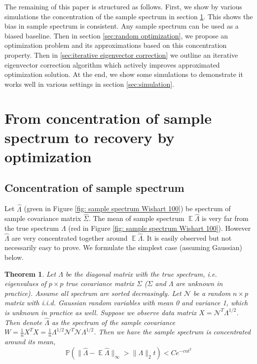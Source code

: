 \documentclass[12pt]{extarticle}
\newtheorem{theorem}{Theorem}
\newcommand{\cN}{{\mathcal{N}}}
\newcommand{\field}[1]{\mathbb{#1}}
\newcommand{\1}{\field{1}}
\newcommand{\p}{\field{P}}
\DeclareMathOperator{\E}{\mathbb{E}}
\numberwithin{equation}{section}
\begin{document}
The remaining of this paper is structured as follows. First, we show by various simulations the concentration of the sample spectrum in section \ref{sec:concentration}. This shows the bias in sample spectrum is consistent. Any sample spectrum can be used as a biased baseline. Then in section \ref{sec:random optimization}, we propose an optimization problem and its approximations based on this concentration property. Then in \ref{sec:iterative eigenvector correction} we outline an iterative eigenvector correction algorithm which actively improves approximated optimization solution. At the end, we show some simulations to demonstrate it works well in various settings in section \ref{sec:simulation}. 




\section{From concentration of sample spectrum to recovery by optimization} \label{sec:concentration}

\subsection{Concentration of sample spectrum}
Let $\hat{\Lambda}$ (green in Figure \ref{fig: sample spectrum Wishart 100}) be spectrum of sample covariance matrix $\hat{\Sigma}$. The mean of sample spectrum $\E \hat{\Lambda}$  is very far from the true spectrum $\Lambda$ (red in Figure \ref{fig: sample spectrum Wishart 100}).  However $\hat{\Lambda}$ are very concentrated together around $\E \hat{\Lambda}$. It is easily observed but not necessarily easy to prove. We formulate the simplest case (assuming Gaussian) below.
\begin{theorem} \label{thm:concentration of sample spectrum}
	Let $\Lambda$ be the diagonal matrix with the true spectrum, i.e. eigenvalues of $p\times p$ true covariance matrix $\Sigma$ ($\Sigma$ and $\Lambda$ are unknown in practice). Assume all spectrum are sorted decreasingly.  Let $\cN$ be a random $n\times p$ matrix with i.i.d. Gaussian random variables with mean 0 and variance 1, which is unknown in practice as well. Suppose we observe data matrix $X= {\cN}^{T} {\Lambda}^{1/2}$. Then denote $\hat{\Lambda}$ as the spectrum of the sample covariance $W=\frac{1}{n}X^TX = \frac{1}{n}{\Lambda}^{1/2}  {\cN}^{T}\cN {\Lambda}^{1/2}$. Then we have the sample spectrum is concentrated around its mean,
\begin{equation} \label{eqn: concentration of sample}
\p(\|\hat{\Lambda}- \E\hat{\Lambda}\|_{\infty} >\|\Lambda\|_2 t )< Ce^{-cnt^2}	
\end{equation}
\end{theorem}
\end{document}
